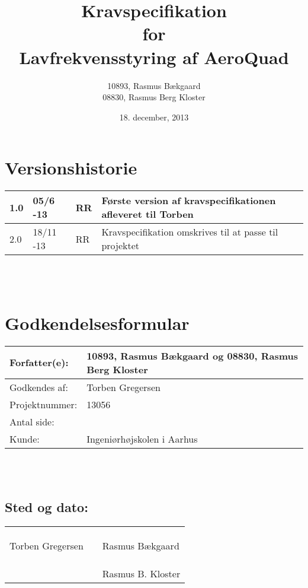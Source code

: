 \documentclass[oneside, 12pt]{memoir}
\title{Kravspecifikation \\ for \\ Lavfrekvensstyring af AeroQuad}
\date{18. december, 2013}
\author{10893, Rasmus Bækgaard\\08830, Rasmus Berg Kloster}
\begin{document}
\begin{titlingpage}
  \maketitle
\end{titlingpage}


\section*{Versionshistorie}
\begin{tabular}{p{}|p{}|p{}|p{}}
1.0 & 05/6 -13 & RR & Første version af kravspecifikationen afleveret til Torben 
\\ \hline 
2.0 & 18/11 -13 & RR & Kravspecifikation omskrives til at passe til projektet 
\end{tabular} 
\\
\\
\section*{Godkendelsesformular}
\begin{tabular}{p{}|p{}}
\hline 
Forfatter(e): & 10893, Rasmus Bækgaard og 08830, Rasmus Berg Kloster\\ 
\hline 
Godkendes af: & Torben Gregersen \\ 
\hline
Projektnummer: & 13056\\
\hline
Antal side: & \pageref{LastPage} \\
\hline 
Kunde: & Ingeniørhøjskolen i Aarhus \\
\hline
\end{tabular} 
\\
\\
\subsection*{Sted og dato:}
\begin{tabular}{p{} p{} p{}}
&& \\
&& \\
\underline{\qquad \qquad \qquad \qquad \qquad} & \qquad \qquad \qquad & \underline{\qquad \qquad \qquad \qquad \qquad}  \\ 
Torben Gregersen & & Rasmus Bækgaard \\ \\\\
&&  \underline{\qquad \qquad \qquad \qquad \qquad}  \\
& & Rasmus B. Kloster
\end{tabular} 
\end{document}
